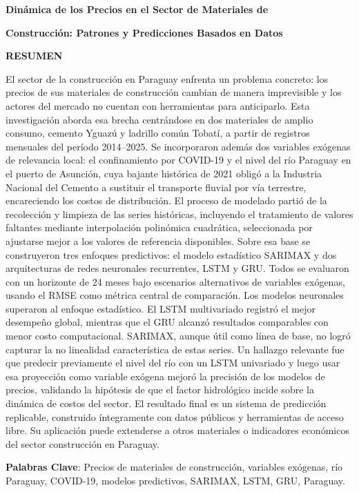 \centerline{\textbf{\large Dinámica de los Precios en el Sector de Materiales de }}
\centerline{\textbf{\large Construcción: Patrones y Predicciones Basados en Datos}}

\vspace{2cm}

\vspace{0.5cm}

\vspace{0.5cm}

\noindent
\textbf{RESUMEN}

\vspace{0.5cm}

\noindent
\justify
El sector de la construcción en Paraguay enfrenta un problema concreto: los precios de sus materiales de construcción cambian de manera imprevisible y los actores del mercado no cuentan con herramientas para anticiparlo. Esta investigación aborda esa brecha centrándose en dos materiales de amplio consumo, cemento Yguazú y ladrillo común Tobatí, a partir de registros mensuales del período 2014--2025. Se incorporaron además dos variables exógenas de relevancia local: el confinamiento por COVID-19 y el nivel del río Paraguay en el puerto de Asunción, cuya bajante histórica de 2021 obligó a la Industria Nacional del Cemento a sustituir el transporte fluvial por vía terrestre, encareciendo los costos de distribución.
\justify
El proceso de modelado partió de la recolección y limpieza de las series históricas, incluyendo el tratamiento de valores faltantes mediante interpolación polinómica cuadrática, seleccionada por ajustarse mejor a los valores de referencia disponibles. Sobre esa base se construyeron tres enfoques predictivos: el modelo estadístico SARIMAX y dos arquitecturas de redes neuronales recurrentes, LSTM y GRU. Todos se evaluaron con un horizonte de 24 meses bajo escenarios alternativos de variables exógenas, usando el RMSE como métrica central de comparación.
\justify
Los modelos neuronales superaron al enfoque estadístico. El LSTM multivariado registró el mejor desempeño global, mientras que el GRU alcanzó resultados comparables con menor costo computacional. SARIMAX, aunque útil como línea de base, no logró capturar la no linealidad característica de estas series. Un hallazgo relevante fue que predecir previamente el nivel del río con un LSTM univariado y luego usar esa proyección como variable exógena mejoró la precisión de los modelos de precios, validando la hipótesis de que el factor hidrológico incide sobre la dinámica de costos del sector.
\justify
El resultado final es un sistema de predicción replicable, construido íntegramente con datos públicos y herramientas de acceso libre. Su aplicación puede extenderse a otros materiales o indicadores económicos del sector construcción en Paraguay.

\vspace{0.5cm}

\noindent
\textbf{Palabras Clave}: Precios de materiales de construcción, variables exógenas, río Paraguay, COVID-19, modelos predictivos, SARIMAX, LSTM, GRU, Paraguay.
